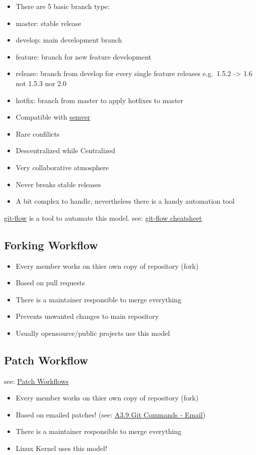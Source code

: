 \documentclass[a4paper,10pt]{article}
\begin{document}
\begin{itemize}
\itemsep1pt\parskip0pt
\item
  There are 5 basic branch type:
\item
  master: stable release
\item
  develop: main development branch
\item
  feature: branch for new feature development
\item
  release: branch from develop for every single feature releases
  e.g.~1.5.2 -\textgreater{} 1.6 not 1.5.3 nor 2.0
\item
  hotfix: branch from master to apply hotfixes to master
\item
  Compatible with \href{http://semver.org/}{semver}
\item
  Rare confilicts
\item
  Descentralized while Centralized
\item
  Very collaborative atmosphere
\item
  Never breaks stable releases
\item
  A bit complex to handle, nevertheless there is a handy automation tool
\end{itemize}

\href{https://github.com/nvie/gitflow}{git-flow} is a tool to automate
this model. see:
\href{http://danielkummer.github.io/git-flow-cheatsheet/}{git-flow
cheatsheet}

\subsection{Forking Workflow}\label{forking-workflow}

\begin{itemize}
\itemsep1pt\parskip0pt
\item
  Every member works on thier own copy of repository (fork)
\item
  Based on pull requests
\item
  There is a maintainer responsible to merge everything
\item
  Prevents unwanted changes to main repository
\item
  Usually opensource/public projects use this model
\end{itemize}

\subsection{Patch Workflow}\label{patch-workflow}

see: \href{http://rypress.com/tutorials/git/patch-workflows}{Patch
Workflows}

\begin{itemize}
\itemsep1pt\parskip0pt
\item
  Every member works on thier own copy of repository (fork)
\item
  Based on emailed patches! (see:
  \href{https://git-scm.com/book/en/v2/Git-Commands-Email}{A3.9 Git
  Commands - Email})
\item
  There is a maintainer responsible to merge everything
\item
  Linux Kernel uses this model!
\end{itemize}
\end{document}
